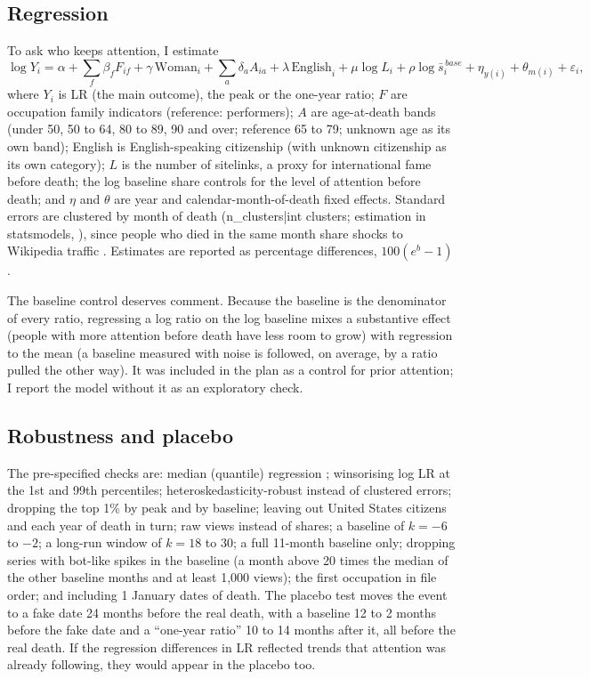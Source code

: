 \documentclass[11pt,a4paper]{article}
\begin{document}
\subsection{Regression}
To ask who keeps attention, I estimate
\begin{equation*}
\log Y_i = \alpha + \textstyle\sum_f \beta_f F_{if} + \gamma\,\text{Woman}_i + \textstyle\sum_a \delta_a A_{ia} + \lambda\,\text{English}_i + \mu \log L_i + \rho \log \bar s_i^{\,base} + \eta_{y(i)} + \theta_{m(i)} + \varepsilon_i,
\end{equation*}
where $Y_i$ is LR (the main outcome), the peak or the one-year ratio; $F$ are occupation family indicators (reference: performers); $A$ are age-at-death bands (under 50, 50 to 64, 80 to 89, 90 and over; reference 65 to 79; unknown age as its own band); English is English-speaking citizenship (with unknown citizenship as its own category); $L$ is the number of sitelinks, a proxy for international fame before death; the log baseline share controls for the level of attention before death; and $\eta$ and $\theta$ are year and calendar-month-of-death fixed effects. Standard errors are clustered by month of death ({{n_clusters|int}} clusters; estimation in statsmodels, \citealp{seabold2010}), since people who died in the same month share shocks to Wikipedia traffic \citep{cameron2015,abadie2023}. Estimates are reported as percentage differences, $100(e^{b} - 1)$.

The baseline control deserves comment. Because the baseline is the denominator of every ratio, regressing a log ratio on the log baseline mixes a substantive effect (people with more attention before death have less room to grow) with regression to the mean (a baseline measured with noise is followed, on average, by a ratio pulled the other way). It was included in the plan as a control for prior attention; I report the model without it as an exploratory check.

\subsection{Robustness and placebo}
The pre-specified checks are: median (quantile) regression \citep{koenker1978}; winsorising log LR at the 1st and 99th percentiles; heteroskedasticity-robust instead of clustered errors; dropping the top 1\% by peak and by baseline; leaving out United States citizens and each year of death in turn; raw views instead of shares; a baseline of $k = -6$ to $-2$; a long-run window of $k = 18$ to $30$; a full 11-month baseline only; dropping series with bot-like spikes in the baseline (a month above 20 times the median of the other baseline months and at least 1,000 views); the first occupation in file order; and including 1 January dates of death. The placebo test moves the event to a fake date 24 months before the real death, with a baseline 12 to 2 months before the fake date and a ``one-year ratio'' 10 to 14 months after it, all before the real death. If the regression differences in LR reflected trends that attention was already following, they would appear in the placebo too.
\end{document}
